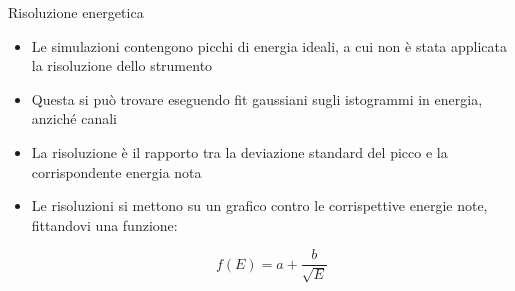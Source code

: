 \documentclass [xcolor=svgnames, 9pt] {beamer}
\begin{document}
\begin{frame}[noframenumbering]{Risoluzione energetica}%
		\begin{itemize}
				\item Le simulazioni contengono picchi di energia ideali, a cui non è stata applicata la risoluzione dello strumento
				\item Questa si può trovare eseguendo fit gaussiani sugli istogrammi in energia, anziché canali
				\item La risoluzione è il rapporto tra la deviazione standard del picco e la corrispondente energia nota
				\item Le risoluzioni si mettono su un grafico contro le corrispettive energie note, fittandovi una funzione:
				
				\begin{equation*}
						f(E) = a + \dfrac{b}{\sqrt{E}}
					\end{equation*}
			\end{itemize}
\end{frame}
\end{document}
